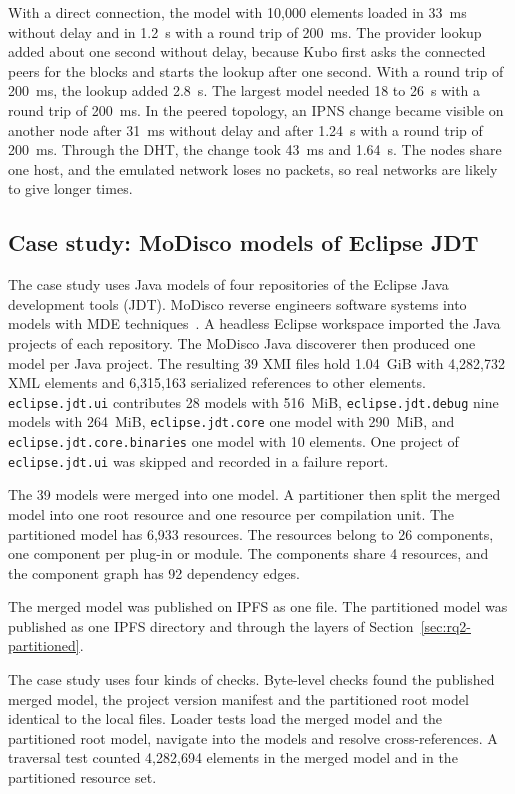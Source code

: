 \documentclass[5p,times,twocolumn]{elsarticle}
\theoremstyle{definition}
\theoremstyle{plain}
\begin{document}
With a direct connection, the model with 10,000 elements loaded in 33~ms without delay and in 1.2~s with a round trip of 200~ms. The provider lookup added about one second without delay, because Kubo first asks the connected peers for the blocks and starts the lookup after one second. With a round trip of 200~ms, the lookup added 2.8~s. The largest model needed 18 to 26~s with a round trip of 200~ms. In the peered topology, an IPNS change became visible on another node after 31~ms without delay and after 1.24~s with a round trip of 200~ms. Through the DHT, the change took 43~ms and 1.64~s. The nodes share one host, and the emulated network loses no packets, so real networks are likely to give longer times.

\subsection{Case study: MoDisco models of Eclipse JDT}\label{sec:evaluation-modisco}

The case study uses Java models of four repositories of the Eclipse Java development tools (JDT). MoDisco reverse engineers software systems into models with MDE techniques~\cite{bruneliere2010modisco,bruneliere2014modisco}. A headless Eclipse workspace imported the Java projects of each repository. The MoDisco Java discoverer then produced one model per Java project. The resulting 39 XMI files hold 1.04~GiB with 4,282,732 XML elements and 6,315,163 serialized references to other elements. \texttt{eclipse.jdt.ui} contributes 28 models with 516~MiB, \texttt{eclipse.jdt.debug} nine models with 264~MiB, \texttt{eclipse.jdt.core} one model with 290~MiB, and \texttt{eclipse.jdt.core.binaries} one model with 10 elements. One project of \texttt{eclipse.jdt.ui} was skipped and recorded in a failure report.

The 39 models were merged into one model. A partitioner then split the merged model into one root resource and one resource per compilation unit. The partitioned model has 6,933 resources. The resources belong to 26 components, one component per plug-in or module. The components share 4 resources, and the component graph has 92 dependency edges.

The merged model was published on IPFS as one file. The partitioned model was published as one IPFS directory and through the layers of Section~\ref{sec:rq2-partitioned}.

The case study uses four kinds of checks. Byte-level checks found the published merged model, the project version manifest and the partitioned root model identical to the local files. Loader tests load the merged model and the partitioned root model, navigate into the models and resolve cross-references. A traversal test counted 4,282,694 elements in the merged model and in the partitioned resource set.
\end{document}
